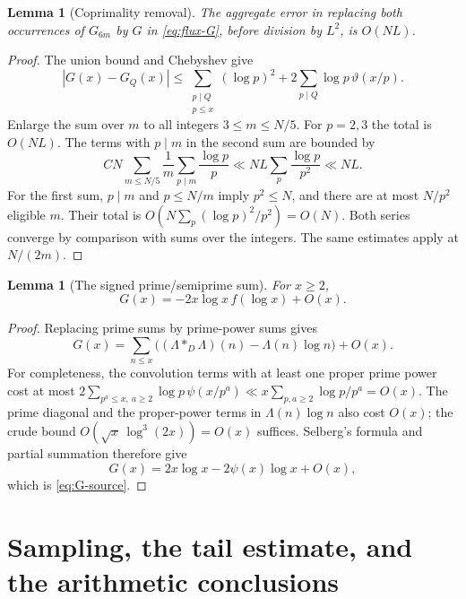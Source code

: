 \documentclass[11pt,letterpaper]{article}
\numberwithin{equation}{section}
\newtheorem{lemma}[theorem]{Lemma}
\theoremstyle{definition}
\theoremstyle{remark}
\begin{document}
\begin{lemma}[Coprimality removal]\label{lem:coprime}
The aggregate error in replacing both occurrences of $G_{6m}$ by $G$
in \eqref{eq:flux-G}, before division by $L^2$, is $O(NL)$.
\end{lemma}
\begin{proof}
The union bound and Chebyshev give
\[
 |G(x)-G_Q(x)|
 \le\sum_{\substack{p\mid Q\\p\le x}}(\log p)^2
      +2\sum_{p\mid Q}\log p\,\vartheta(x/p).
\]
Enlarge the sum over $m$ to all integers $3\le m\le N/5$.
For $p=2,3$ the total is $O(NL)$. The terms with $p\mid m$ in the second
sum are bounded by
\[
 CN\sum_{m\le N/5}\frac1m\sum_{p\mid m}\frac{\log p}{p}
 \ll NL\sum_p\frac{\log p}{p^2}\ll NL.
\]
For the first sum, $p\mid m$ and $p\le N/m$ imply $p^2\le N$, and
there are at most $N/p^2$ eligible $m$. Their total is
$O(N\sum_p(\log p)^2/p^2)=O(N)$. Both series converge by comparison
with sums over the integers. The same estimates apply at $N/(2m)$.
\end{proof}

\begin{lemma}[The signed prime/semiprime sum]\label{lem:G}
For $x\ge2$,
\begin{equation}\label{eq:G-source}
 G(x)=-2x\log x\,f(\log x)+O(x).
\end{equation}
\end{lemma}
\begin{proof}
Replacing prime sums by prime-power sums gives
\[
 G(x)=\sum_{n\le x}\bigl((\Lambda*_D\Lambda)(n)-\Lambda(n)\log n\bigr)+O(x).
\]
For completeness, the convolution terms with at least one proper prime
power cost at most
$2\sum_{p^a\le x,\ a\ge2}\log p\,\psi(x/p^a)
 \ll x\sum_{p,a\ge2}\log p/p^a=O(x)$.
The prime diagonal and the proper-power terms in $\Lambda(n)\log n$
also cost $O(x)$; the crude bound $O(\sqrt x\,\log^3(2x))=O(x)$
suffices. Selberg's formula and partial summation therefore give
\[
 G(x)=2x\log x-2\psi(x)\log x+O(x),
\]
which is \eqref{eq:G-source}.
\end{proof}

\section{Sampling, the tail estimate, and the arithmetic conclusions}
\label{sec:transfer}
\end{document}
